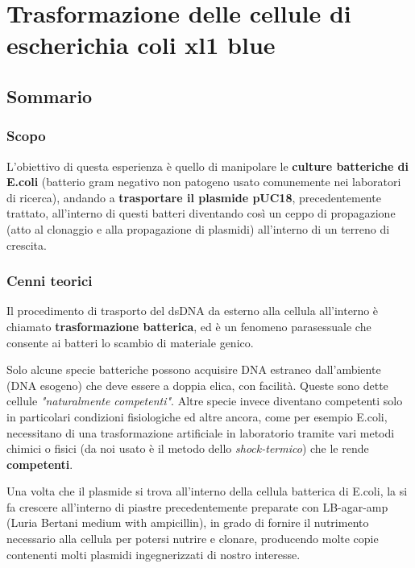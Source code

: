 \section{\LARGE{Trasformazione delle cellule di escherichia coli xl1 blue}}

\vspace{0.6cm}

\subsection{Sommario}

\subsubsection{Scopo}

L'obiettivo di questa esperienza è quello di manipolare le \textbf{culture batteriche di E.coli}
(batterio gram negativo non patogeno usato comunemente nei laboratori di ricerca),
andando a \textbf{trasportare il plasmide pUC18}, precedentemente trattato,
all'interno di questi batteri diventando cos\`i un ceppo di propagazione
(atto al clonaggio e alla propagazione di plasmidi) all'interno di un terreno di crescita.

\subsubsection{Cenni teorici}

Il procedimento di trasporto del dsDNA da esterno alla cellula all'interno è chiamato
\textbf{trasformazione batterica}, ed è un fenomeno parasessuale che consente ai batteri
lo scambio di materiale genico.

Solo alcune specie batteriche possono acquisire DNA estraneo dall'ambiente (DNA esogeno)
che deve essere a doppia elica, con facilità.
Queste sono dette cellule \textit{"naturalmente competenti"}.
Altre specie invece diventano competenti solo in particolari condizioni fisiologiche
ed altre ancora, come per esempio E.coli, necessitano di una trasformazione artificiale in
laboratorio tramite vari metodi chimici o fisici
(da noi usato è il metodo dello \textit{shock-termico}) che le rende \textbf{competenti}.

Una volta che il plasmide si trova all'interno della cellula batterica di E.coli,
la si fa crescere all'interno di piastre precedentemente preparate con LB-agar-amp
(Luria Bertani medium with ampicillin), in grado di fornire il nutrimento necessario
alla cellula per potersi nutrire e clonare,
producendo molte copie contenenti molti plasmidi ingegnerizzati di nostro interesse.

